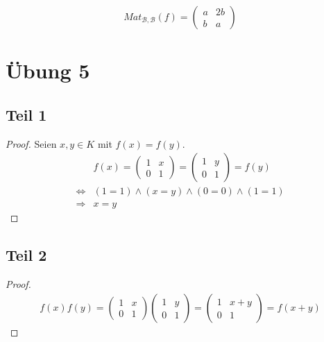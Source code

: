 \documentclass[a4paper,10pt]{article}
\begin{document}
\begin{equation}
 Mat_{\mathcal{B}, \mathcal{B}}(f) = \begin{pmatrix}
                                      a & 2b\\
                                      b & a
                                     \end{pmatrix}
\end{equation}

\section*{Übung 5}

\subsection*{Teil 1}

\begin{proof}
 Seien $x, y \in K$ mit $f(x) = f(y)$.
 \begin{align}
  & f(x) = \begin{pmatrix}
        1 & x\\
        0 & 1
       \end{pmatrix}
        = \begin{pmatrix}
        1 & y\\
        0 & 1
       \end{pmatrix} = f(y)\\
  \Leftrightarrow & (1 = 1) \land (x = y) \land (0 = 0) \land (1 = 1)\\
  \Rightarrow & x = y
 \end{align}
\end{proof}

\subsection*{Teil 2}

\begin{proof}
 \begin{align}
  f(x)f(y) = \begin{pmatrix}
        1 & x\\
        0 & 1
       \end{pmatrix}
       \begin{pmatrix}
        1 & y\\
        0 & 1
       \end{pmatrix}
       = \begin{pmatrix}
        1 & x + y\\
        0 & 1
       \end{pmatrix} = f(x + y) 
 \end{align}
\end{proof}
\end{document}
